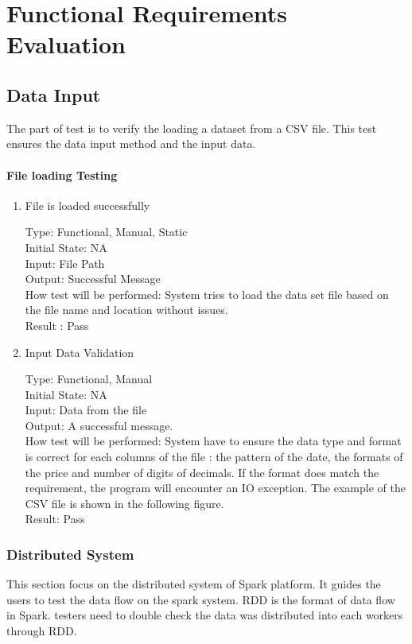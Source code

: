 \documentclass[12pt, titlepage]{article}
\begin{document}
\section{Functional Requirements Evaluation}
\subsection{Data Input}
The part of test is to verify the loading a dataset from a CSV file. This test ensures the data input method and the input data. 

\paragraph{File loading Testing }

\begin{enumerate}

\item{File is loaded successfully\\}

Type: Functional, Manual, Static\\
Initial State: NA\\
Input: File Path\\
Output: Successful Message\\
How test will be performed: System tries to load the data set file based on the file name and location without issues.\\
Result : Pass\\
\item{Input Data Validation\\}

Type: Functional, Manual\\
Initial State: NA\\
Input: Data from the file\\
Output: A successful message.\\
How test will be performed: System have to ensure the data type and format is
correct for each columns of the file : the pattern of the date, the formats
of the price and number of digits of decimals. If the format does match the requirement, the program will encounter an IO exception.
The example of the CSV file is shown in the following figure. \\
Result: Pass\\

\end{enumerate}

\subsubsection{Distributed System}
This section focus on the distributed system of Spark platform. It guides the
users to test the data flow on the spark system. RDD is the format of data flow
in Spark. testers need to double check the data was distributed into each
workers through RDD.
\end{document}
